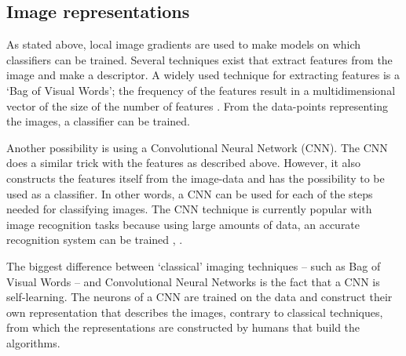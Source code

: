 
\subsection{Image representations}
\label{sec:Theory-image}
As stated above, local image gradients are used to make models on which classifiers can be trained.
Several techniques exist that extract features from the image and make a descriptor.
A widely used technique for extracting features is a `Bag of Visual Words'; the frequency of the features result in a multidimensional vector of the size of the number of features \citep{csurka2004visual}.
From the data-points representing the images, a classifier can be trained.

Another possibility is using a Convolutional Neural Network (CNN).
The CNN does a similar trick with the features as described above.
However, it also constructs the features itself from the image-data and has the possibility to be used as a classifier.
In other words, a CNN can be used for each of the steps needed for classifying images.
The CNN technique is currently popular with image recognition tasks because
using large amounts of data, an accurate recognition system can be trained \citep{girshick2014rich}, \citep{razavian2014cnn}.

The biggest difference between `classical' imaging techniques -- such as Bag of Visual Words -- and Convolutional Neural Networks is the fact that a CNN is self-learning.
The neurons of a CNN are trained on the data and construct their own representation that describes the images, contrary to classical techniques, from which the representations are constructed by humans that build the algorithms.



